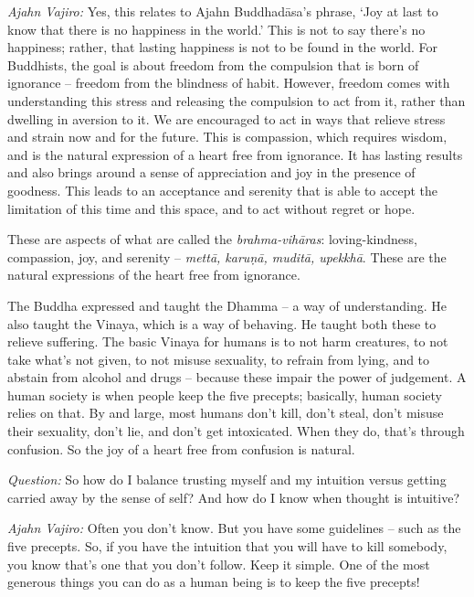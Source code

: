 \emph{Ajahn Vajiro:} Yes, this relates to Ajahn Buddhadāsa's phrase, `Joy at last to
know that there is no happiness in the world.' This is not to say there's no
happiness; rather, that lasting happiness is not to be found in the world. For
Buddhists, the goal is about freedom from the compulsion that is born of
ignorance -- freedom from the blindness of habit. However, freedom comes with
understanding this stress and releasing the compulsion to act from it, rather
than dwelling in aversion to it. We are encouraged to act in ways that relieve
stress and strain now and for the future. This is compassion, which requires
wisdom, and is the natural expression of a heart free from ignorance. It has
lasting results and also brings around a sense of appreciation and joy in the
presence of goodness. This leads to an acceptance and serenity that is able to
accept the limitation of this time and this space, and to act without regret or
hope.

These are aspects of what are called the \emph{brahma-vihāras}: loving-kindness,
compassion, joy, and serenity -- \emph{mettā, karuṇā, muditā, upekkhā}. These
are the natural expressions of the heart free from ignorance.

The Buddha expressed and taught the Dhamma -- a way of understanding. He also
taught the Vinaya, which is a way of behaving. He taught both these to relieve
suffering. The basic Vinaya for humans is to not harm creatures, to not take
what's not given, to not misuse sexuality, to refrain from lying, and to abstain
from alcohol and drugs -- because these impair the power of judgement. A human
society is when people keep the five precepts; basically, human society relies
on that. By and large, most humans don't kill, don't steal, don't misuse their
sexuality, don't lie, and don't get intoxicated. When they do, that's through
confusion. So the joy of a heart free from confusion is natural.

\clearpage

\emph{Question:} So how do I balance trusting myself and my intuition versus getting
carried away by the sense of self? And how do I know when thought is intuitive?

\emph{Ajahn Vajiro:} Often you don't know. But you have some guidelines -- such as the
five precepts. So, if you have the intuition that you will have to kill
somebody, you know that's one that you don't follow. Keep it simple. One of the
most generous things you can do as a human being is to keep the five precepts!

